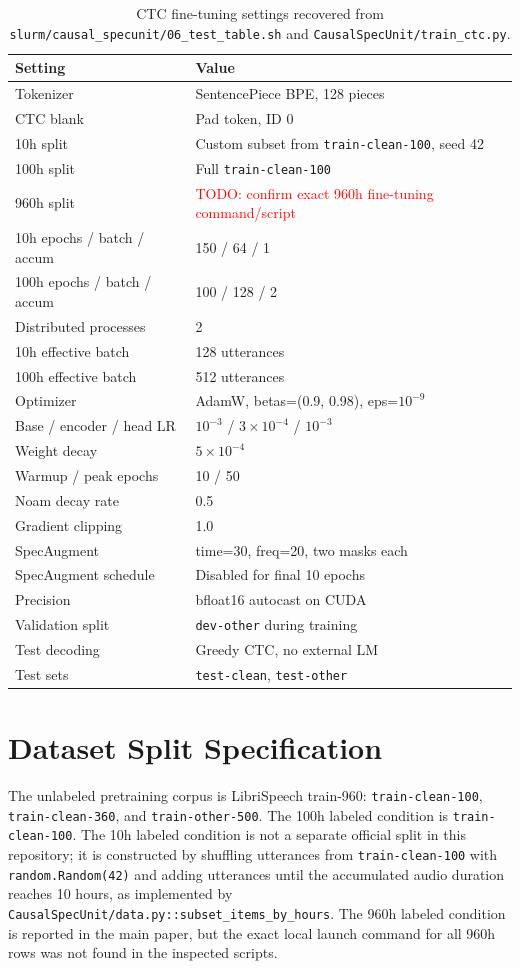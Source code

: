 \documentclass{article}
\newcommand{\todo}[1]{\textcolor{red}{TODO: #1}}
\newcommand{\code}[1]{\texttt{#1}}
\begin{document}
\begin{table}[h]
\centering
\small
\caption{CTC fine-tuning settings recovered from
\code{slurm/causal\_specunit/06\_test\_table.sh} and
\code{CausalSpecUnit/train\_ctc.py}.}
\begin{tabular}{@{}ll@{}}
\toprule
Setting & Value \\
\midrule
Tokenizer & SentencePiece BPE, 128 pieces \\
CTC blank & Pad token, ID 0 \\
10h split & Custom subset from \code{train-clean-100}, seed 42 \\
100h split & Full \code{train-clean-100} \\
960h split & \todo{confirm exact 960h fine-tuning command/script} \\
10h epochs / batch / accum & 150 / 64 / 1 \\
100h epochs / batch / accum & 100 / 128 / 2 \\
Distributed processes & 2 \\
10h effective batch & 128 utterances \\
100h effective batch & 512 utterances \\
Optimizer & AdamW, betas=(0.9, 0.98), eps=$10^{-9}$ \\
Base / encoder / head LR & $10^{-3}$ / $3\times10^{-4}$ / $10^{-3}$ \\
Weight decay & $5\times10^{-4}$ \\
Warmup / peak epochs & 10 / 50 \\
Noam decay rate & 0.5 \\
Gradient clipping & 1.0 \\
SpecAugment & time=30, freq=20, two masks each \\
SpecAugment schedule & Disabled for final 10 epochs \\
Precision & bfloat16 autocast on CUDA \\
Validation split & \code{dev-other} during training \\
Test decoding & Greedy CTC, no external LM \\
Test sets & \code{test-clean}, \code{test-other} \\
\bottomrule
\end{tabular}
\end{table}

\section{Dataset Split Specification}
The unlabeled pretraining corpus is LibriSpeech train-960:
\code{train-clean-100}, \code{train-clean-360}, and \code{train-other-500}.
The 100h labeled condition is \code{train-clean-100}. The 10h labeled
condition is not a separate official split in this repository; it is
constructed by shuffling utterances from \code{train-clean-100} with
\code{random.Random(42)} and adding utterances until the accumulated audio
duration reaches 10 hours, as implemented by
\code{CausalSpecUnit/data.py::subset\_items\_by\_hours}. The 960h labeled
condition is reported in the main paper, but the exact local launch command
for all 960h rows was not found in the inspected scripts.
\end{document}
